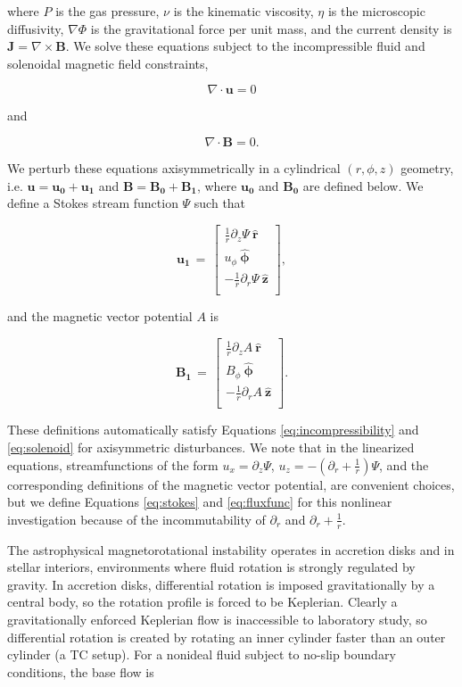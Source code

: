 \documentclass{emulateapj}
\newcommand{\beq}{\begin{equation}}
\newcommand{\eeq}{\end{equation}}
\newcommand{\uphi}{\ensuremath{u_\phi}}
\newcommand{\rhat}{\ensuremath{\mathbf{\hat{r}}}}
\newcommand{\phihat}{\ensuremath{\mathbf{\hat{\phi}}}}
\newcommand{\zhat}{\ensuremath{\mathbf{\hat{z}}}}
\begin{document}
where $P$ is the gas pressure, $\nu$ is the kinematic viscosity, $\eta$ is the microscopic diffusivity, $\nabla\Phi$ is the gravitational force per unit mass, and the current density is $\mathbf{J} = \nabla\times\mathbf{B}$. We solve these equations subject to the incompressible fluid and solenoidal magnetic field constraints,

\beq
\label{eq:incompressibility}
\nabla \cdot \mathbf{u} = 0
\eeq

and 

\beq
\label{eq:solenoid}
\nabla \cdot \mathbf{B} = 0.
\eeq

We perturb these equations axisymmetrically in a cylindrical $(r, \phi, z)$ geometry, i.e. $\mathbf{u} = \mathbf{u_0} + \mathbf{u_1}$ and $\mathbf{B} = \mathbf{B_0} + \mathbf{B_1}$, where $\mathbf{u_0}$ and $\mathbf{B_0}$ are defined below. We define a Stokes stream function $\Psi$ such that 

\beq
  \label{eq:stokes}
  \mathbf{u_1} \, = \, \left[\begin{matrix}
\frac{1}{r} \partial_z \Psi\ \rhat\\
\uphi \ \phihat\\
-\frac{1}{r} \partial_r \Psi\ \zhat\\
\end{matrix}\right],
\eeq

and the magnetic vector potential $A$ is

\beq
  \label{eq:fluxfunc}
  \mathbf{B_1} \, = \, \left[\begin{matrix}
\frac{1}{r} \partial_z A\ \rhat\\
B_{\phi} \ \phihat\\
-\frac{1}{r} \partial_r A\ \zhat\\
\end{matrix}\right].
\eeq

These definitions automatically satisfy Equations \ref{eq:incompressibility} and \ref{eq:solenoid} for axisymmetric disturbances. We note that in the linearized equations, streamfunctions of the form $u_x = \partial_z \Psi$, $u_z = -(\partial_r + \frac{1}{r}) \Psi$, and the corresponding definitions of the magnetic vector potential, are convenient choices, but we define Equations \ref{eq:stokes} and \ref{eq:fluxfunc} for this nonlinear investigation because of the incommutability of $\partial_r$ and $\partial_r + \frac{1}{r}$. 

The astrophysical magnetorotational instability operates in accretion disks and in stellar interiors, environments where fluid rotation is strongly regulated by gravity. In accretion disks, differential rotation is imposed gravitationally by a central body, so the rotation profile is forced to be Keplerian. Clearly a gravitationally enforced Keplerian flow is inaccessible to laboratory study, so differential rotation is created by rotating an inner cylinder faster than an outer cylinder (a TC setup). For a nonideal fluid subject to no-slip boundary conditions, the base flow is
\end{document}
